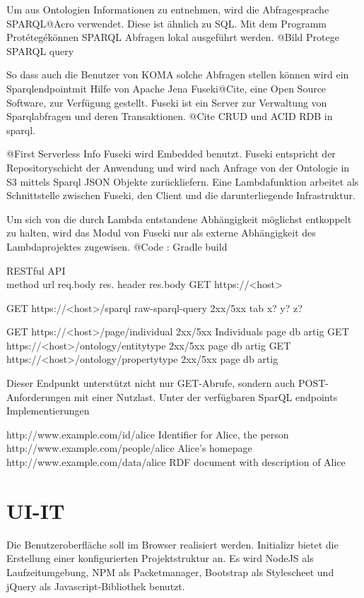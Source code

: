 \documentclass[
12pt,
english,
ngerman,
headsepline,
twoside,
openright,
numbers=noenddot,version=first
]{scrreprt}
\begin{document}
Um aus Ontologien Informationen zu entnehmen, wird die Abfragesprache \glqq SPARQL\grqq @Acro verwendet. Diese ist ähnlich zu SQL. Mit dem Programm \glqq Protétegé\grqq können SPARQL Abfragen lokal ausgeführt werden. 
@Bild Protege SPARQL query

So dass auch die Benutzer von KOMA solche Abfragen stellen können wird ein \glqq Sparqlendpoint\grqq mit Hilfe von Apache Jena Fuseki@Cite, eine Open Source Software, zur Verfügung gestellt. Fuseki ist ein Server zur Verwaltung von Sparqlabfragen und deren Transaktionen. @Cite CRUD und ACID RDB in sparql. 

@First Serverless Info
Fuseki wird Embedded benutzt.
Fuseki entspricht der Repositoryschicht der Anwendung und wird nach Anfrage von der Ontologie in S3 mittels Sparql JSON Objekte zurückliefern. 
Eine Lambdafunktion arbeitet als Schnittstelle zwischen Fuseki, den Client und die darunterliegende Infrastruktur. 

Um sich von die durch Lambda entstandene Abhängigkeit möglichst entkoppelt\cite{FlowerRefactoring} zu halten, wird das Modul von Fuseki nur als externe Abhängigkeit des Lambdaprojektes zugewisen. 
@Code : Gradle build\cite{Muschko2014}

RESTful API \\
method   url    req.body    res. header res.body
GET https://<host>

GET https://<host>/sparql raw-sparql-query    2xx/5xx     tab x? y? z?

GET https://<host>/page/individual 2xx/5xx Individuals page db artig
GET https://<host>/ontology/entitytype 2xx/5xx  page db artig
GET https://<host>/ontology/propertytype 2xx/5xx  page db artig

Dieser Endpunkt unterstützt nicht nur GET-Abrufe, sondern auch POST-Anforderungen mit einer Nutzlast.
Unter der verfügbaren SparQL endpoints Implementierungen


http://www.example.com/id/alice
Identifier for Alice, the person
http://www.example.com/people/alice
Alice's homepage
http://www.example.com/data/alice
RDF document with description of Alice

\section{UI-IT}

Die Benutzeroberfläche soll im Browser realisiert werden. Initializr bietet die Erstellung einer konfigurierten Projektstruktur an. Es wird NodeJS als Laufzeitumgebung, NPM als Packetmanager, Bootstrap als Stylescheet und jQuery als Javascript-Bibliothek benutzt. 
\end{document}
